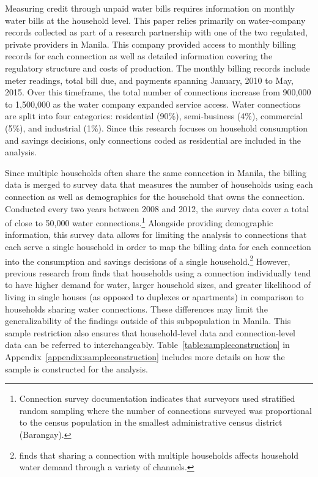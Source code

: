 \documentclass[12pt]{article}
\begin{document}

Measuring credit through unpaid water bills requires information on monthly water bills at the household level.  This paper relies primarily on water-company records collected as part of a research partnership with one of the two regulated, private providers in Manila.  This company provided access to monthly billing records for each connection as well as detailed information covering the regulatory structure and costs of production.  The monthly billing records include meter readings, total bill due, and payments spanning January, 2010 to May, 2015.  Over this timeframe, the total number of connections increase from 900,000 to 1,500,000 as the water company expanded service access.  Water connections are split into four categories: residential (90\%), semi-business (4\%), commercial (5\%), and industrial (1\%).  Since this research focuses on household consumption and savings decisions, only connections coded as residential are included in the analysis.  


Since multiple households often share the same connection in Manila, the billing data is merged to survey data that measures the number of households using each connection as well as demographics for the household that owns the connection.  Conducted every two years between 2008 and 2012, the survey data cover a total of close to 50,000 water connections.\footnote{Connection survey documentation indicates that surveyors used stratified random sampling where the number of connections surveyed was proportional to the census population in the smallest administrative census district (Barangay).}  Alongside providing demographic information, this survey data allows for limiting the analysis to connections that each serve a single household in order to map the billing data for each connection into the consumption and savings decisions of a single household.\footnote{\cite{wjv} finds that sharing a connection with multiple households affects household water demand through a variety of channels.}   However, previous research from \cite{wjv} finds that households using a connection individually tend to have higher demand for water, larger household sizes, and greater likelihood of living in single houses (as opposed to duplexes or apartments) in comparison to households sharing water connections.  These differences may limit the generalizability of the findings outside of this subpopulation in Manila.  This sample restriction also ensures that household-level data and connection-level data can be referred to interchangeably.  Table~\ref{table:sampleconstruction} in Appendix~\ref{appendix:sampleconstruction} includes more details on how the sample is constructed for the analysis.
\end{document}
